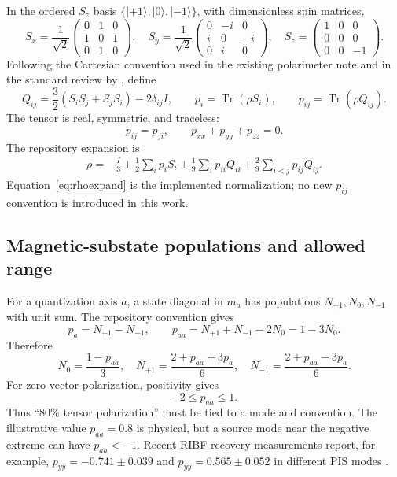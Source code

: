 \documentclass[11pt,a4paper]{article}
\newcommand{\Tr}{\operatorname{Tr}}
\begin{document}
In the ordered $S_z$ basis $\{|+1\rangle,|0\rangle,|-1\rangle\}$, with dimensionless spin matrices,
\begin{equation}
 S_x=\frac{1}{\sqrt2}\begin{pmatrix}0&1&0\\1&0&1\\0&1&0\end{pmatrix},\quad
 S_y=\frac{1}{\sqrt2}\begin{pmatrix}0&-i&0\\i&0&-i\\0&i&0\end{pmatrix},\quad
 S_z=\begin{pmatrix}1&0&0\\0&0&0\\0&0&-1\end{pmatrix}.
\end{equation}
Following the Cartesian convention used in the existing polarimeter note and in the standard review by \citet{Ohlsen1972}, define
\begin{equation}
 Q_{ij}=\frac{3}{2}(S_iS_j+S_jS_i)-2\delta_{ij}I,
 \qquad p_i=\Tr(\rho S_i),\qquad p_{ij}=\Tr(\rho Q_{ij}). \label{eq:operators}
\end{equation}
The tensor is real, symmetric, and traceless:
\begin{equation}
 p_{ij}=p_{ji},\qquad p_{xx}+p_{yy}+p_{zz}=0. \label{eq:tracefree}
\end{equation}
The repository expansion is
\begin{align}
 \rho={}&\frac{I}{3}+\frac12\sum_i p_iS_i
 +\frac19\sum_i p_{ii}Q_{ii}
 +\frac29\sum_{i<j}p_{ij}Q_{ij}. \label{eq:rhoexpand}
\end{align}
Equation~\eqref{eq:rhoexpand} is the implemented normalization; no new $p_{ij}$ convention is introduced in this work.

\subsection{Magnetic-substate populations and allowed range}

For a quantization axis $a$, a state diagonal in $m_a$ has populations $N_{+1},N_0,N_{-1}$ with unit sum.  The repository convention gives
\begin{equation}
 p_a=N_{+1}-N_{-1},\qquad
 p_{aa}=N_{+1}+N_{-1}-2N_0=1-3N_0. \label{eq:popdef}
\end{equation}
Therefore
\begin{equation}
 N_0=\frac{1-p_{aa}}{3},\quad
 N_{+1}=\frac{2+p_{aa}+3p_a}{6},\quad
 N_{-1}=\frac{2+p_{aa}-3p_a}{6}. \label{eq:pops}
\end{equation}
For zero vector polarization, positivity gives
\begin{equation}
 -2\le p_{aa}\le 1. \label{eq:range}
\end{equation}
Thus ``80\% tensor polarization'' must be tied to a mode and convention.  The illustrative value $p_{aa}=0.8$ is physical, but a source mode near the negative extreme can have $p_{aa}<-1$.  Recent RIBF recovery measurements report, for example, $p_{yy}=-0.741\pm0.039$ and $p_{yy}=0.565\pm0.052$ in different PIS modes \citep{RIKENAPR58Polarization}.
\end{document}
